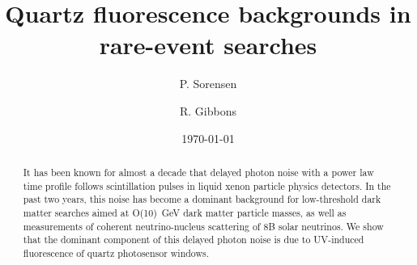 \documentclass[%
 reprint,
superscriptaddress,
nofootinbib,
 amsmath,amssymb,
 aps,
prl,
]{revtex4-2}
\begin{document}

\title{Quartz fluorescence backgrounds in rare-event searches}%



\author{P. Sorensen}
\author{R. Gibbons}%


\date{\today}%

\begin{abstract}
It has been known for almost a decade that delayed photon noise with a power law time profile follows scintillation pulses in liquid xenon particle physics detectors. In the past two years, this noise has become a dominant background for low-threshold dark matter searches aimed at O(10)~GeV dark matter particle masses, as well as measurements of coherent neutrino-nucleus scattering of 8B solar neutrinos. We show that the dominant component of this delayed photon noise is due to UV-induced fluorescence of quartz photosensor windows.
\end{abstract}

\maketitle


\end{document}
